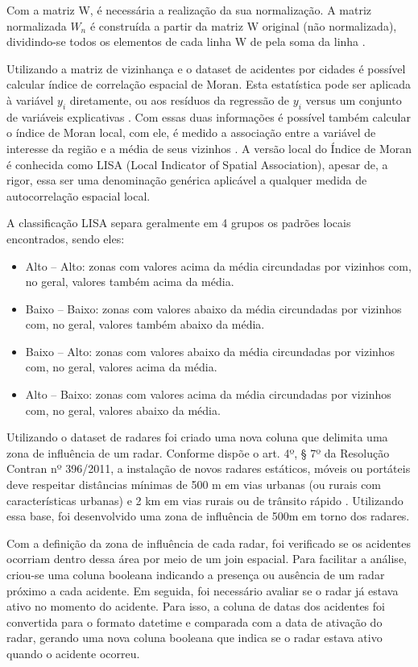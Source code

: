 \documentclass[12pt]{article}
\begin{document}
Com a matriz W, é necessária a realização da sua normalização. A matriz normalizada $W_{n}$
é construída a partir da matriz W original (não normalizada), dividindo-se todos os
elementos de cada linha W de pela soma da linha \cite{carvalho2010}.

Utilizando a matriz de vizinhança e o dataset de acidentes por cidades é possível calcular índice de correlação espacial de Moran.  Esta estatística pode ser aplicada à variável $y_{i}$ diretamente, ou aos resíduos da regressão de $y_{i}$ versus um conjunto de variáveis explicativas \cite{carvalho2010}. Com essas duas informações é possível também calcular o índice de Moran local, com ele, é medido a associação entre a variável de interesse da região e a média de seus vizinhos \cite{firme2021econometria}. A versão local do Índice de Moran é conhecida como LISA (Local Indicator of Spatial Association), apesar de, a rigor, essa ser uma denominação genérica aplicável a qualquer medida de autocorrelação espacial local. \cite{Saboya}

A classificação LISA separa geralmente em 4 grupos os padrões locais encontrados, sendo eles:
\begin{itemize}
    \item Alto – Alto: zonas com valores acima da média circundadas por vizinhos com, no geral, valores também acima da média.
    \item Baixo – Baixo: zonas com valores abaixo da média circundadas por vizinhos com, no geral, valores também abaixo da média.
    \item Baixo – Alto: zonas com valores abaixo da média circundadas por vizinhos com, no geral, valores acima da média.
    \item Alto – Baixo: zonas com valores acima da média circundadas por vizinhos com, no geral, valores abaixo da média.
\end{itemize}

Utilizando o dataset de radares foi criado uma nova coluna que delimita uma zona de influência de um radar. Conforme dispõe o art. 4º, § 7º da Resolução Contran nº 396/2011, a instalação de novos radares estáticos, móveis ou portáteis deve respeitar distâncias mínimas de 500 m em vias urbanas (ou rurais com características urbanas) e 2 km em vias rurais ou de trânsito rápido \cite{araujo2006}. Utilizando essa base, foi desenvolvido uma zona de influência de 500m em torno dos radares.

Com a definição da zona de influência de cada radar, foi verificado se os acidentes ocorriam dentro dessa área por meio de um join espacial. Para facilitar a análise, criou-se uma coluna booleana indicando a presença ou ausência de um radar próximo a cada acidente. Em seguida, foi necessário avaliar se o radar já estava ativo no momento do acidente. Para isso, a coluna de datas dos acidentes foi convertida para o formato datetime e comparada com a data de ativação do radar, gerando uma nova coluna booleana que indica se o radar estava ativo quando o acidente ocorreu.
\end{document}
